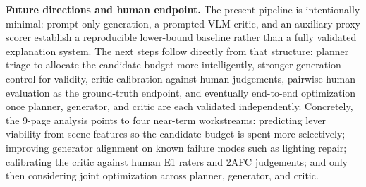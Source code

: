 \noindent\textbf{Future directions and human endpoint.} The present
pipeline is intentionally minimal: prompt-only generation, a prompted
VLM critic, and an auxiliary proxy scorer establish a reproducible
lower-bound baseline rather than a fully validated explanation system.
The next steps follow directly from that structure: planner triage to
allocate the candidate budget more intelligently, stronger generation
control for validity, critic calibration against human judgements,
pairwise human evaluation as the ground-truth endpoint, and eventually
end-to-end optimization once planner, generator, and critic are each
validated independently. Concretely, the 9-page analysis points to four
near-term workstreams: predicting lever viability from scene features so
the candidate budget is spent more selectively; improving generator
alignment on known failure modes such as lighting repair; calibrating
the critic against human E1 raters and 2AFC judgements; and only then
considering joint optimization across planner, generator, and critic.
